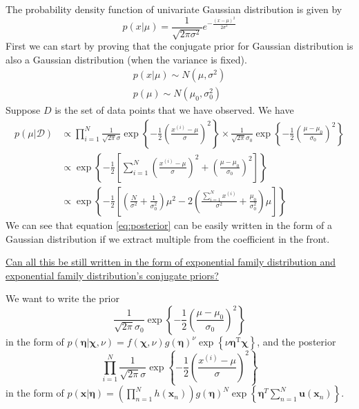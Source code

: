 \documentclass[12pt]{article}
\begin{document}
The probability density function of univariate Gaussian distribution is given by
\begin{equation}\label{eq:gaussian}
    p(x|\mu)=\frac{1}{\sqrt{2 \pi \sigma^{2}}} e^{-\frac{(x-\mu)^{2}}{2 \sigma^{2}}}
\end{equation}
First we can start by proving that the conjugate prior for Gaussian distribution is also a Gaussian distribution (when the variance is fixed).
\begin{displaymath}
    \begin{array}{l}{p(x | \mu) \sim N\left(\mu, \sigma^{2}\right)} \\ {p(\mu) \sim N\left(\mu_{0}, \sigma_{0}^{2}\right)}\end{array}
\end{displaymath}
Suppose $D$ is the set of data points that we have observed. We have
\begin{equation}\label{eq:posterior}
    \begin{aligned}
        p(\mu | \mathcal{D}) & \propto  \prod_{i=1}^{N} \frac{1}{\sqrt{2 \pi} \sigma} \exp \left\{-\frac{1}{2}\left(\frac{x^{(i)}-\mu}{\sigma}\right)^{2}\right\} \times \frac{1}{\sqrt{2 \pi} \sigma_{0}} \exp \left\{-\frac{1}{2}\left(\frac{\mu-\mu_{0}}{\sigma_{0}}\right)^{2}\right\} \\
                             & \propto \exp\left\{-\frac{1}{2}\left[\sum_{i=1}^{N}\left(\frac{x^{(i)}-\mu}{\sigma}\right)^{2}+\left(\frac{\mu-\mu_{0}}{\sigma_{0}}\right)^{2}\right]\right\}                                                                                               \\
                             & \propto \exp \left\{-\frac{1}{2}\left[\left(\frac{N}{\sigma^{2}}+\frac{1}{\sigma_{0}^{2}}\right) \mu^{2}-2\left(\frac{\sum_{i=1}^{N} x^{(i)}}{\sigma^{2}}+\frac{\mu_{0}}{\sigma_{0}^{2}}\right) \mu\right]\right\}
    \end{aligned}
\end{equation}
We can see that equation \ref{eq:posterior} can be easily written in the form of a Gaussian distribution if we extract multiple from the coefficient in the front.

\ul{Can all this be still written in the form of exponential family distribution and exponential family distribution's conjugate priors?}

We want to write the prior
$$\frac{1}{\sqrt{2 \pi} \sigma_{0}} \exp \left\{-\frac{1}{2}\left(\frac{\mu-\mu_{0}}{\sigma_{0}}\right)^{2}\right\}$$ in the form of $p(\boldsymbol{\eta} | \boldsymbol{\chi}, \nu)=f(\boldsymbol{\chi}, \nu) g(\boldsymbol{\eta})^{\nu} \exp \left\{\nu \boldsymbol{\eta}^{\mathrm{T}} \boldsymbol{\chi}\right\}$, and the posterior 
\begin{displaymath}
\prod_{i=1}^{N}\frac{1}{\sqrt{2\pi}\sigma}\exp\left\{-\frac{1}{2}\left(\frac{x^{(i)}-\mu}{\sigma}\right)^2\right\}
\end{displaymath} in the form of $p(\mathbf{x}|\bm{\eta})=\left(\prod_{n=1}^{N}h(\mathbf{x}_n)\right)g(\bm{\eta})^{N}\exp\left\{\bm{\eta}^T\sum_{n=1}^{N}\mathbf{u}(\mathbf{x}_n)\right\}$.
\end{document}

